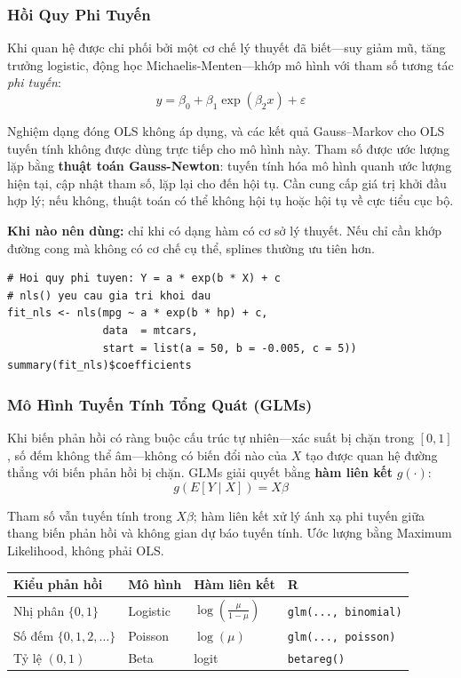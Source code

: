 \subsubsection{Hồi Quy Phi Tuyến}

Khi quan hệ được chi phối bởi một cơ chế lý thuyết đã biết---suy giảm mũ, tăng trưởng logistic, động học Michaelis-Menten---khớp mô hình với tham số tương tác \textit{phi tuyến}:
\[
  y = \beta_0 + \beta_1 \exp(\beta_2 x) + \varepsilon
\]

Nghiệm dạng đóng OLS không áp dụng, và các kết quả Gauss--Markov cho OLS tuyến tính không được dùng trực tiếp cho mô hình này. Tham số được ước lượng lặp bằng \textbf{thuật toán Gauss-Newton}: tuyến tính hóa mô hình quanh ước lượng hiện tại, cập nhật tham số, lặp lại cho đến hội tụ. Cần cung cấp giá trị khởi đầu hợp lý; nếu không, thuật toán có thể không hội tụ hoặc hội tụ về cực tiểu cục bộ.

\textbf{Khi nào nên dùng:} chỉ khi có dạng hàm có cơ sở lý thuyết. Nếu chỉ cần khớp đường cong mà không có cơ chế cụ thể, splines thường ưu tiên hơn.

\begin{lstlisting}[style=Rstyle]
# Hoi quy phi tuyen: Y = a * exp(b * X) + c
# nls() yeu cau gia tri khoi dau
fit_nls <- nls(mpg ~ a * exp(b * hp) + c,
               data  = mtcars,
               start = list(a = 50, b = -0.005, c = 5))
summary(fit_nls)$coefficients
\end{lstlisting}

\subsubsection{Mô Hình Tuyến Tính Tổng Quát (GLMs)}

Khi biến phản hồi có ràng buộc cấu trúc tự nhiên---xác suất bị chặn trong $[0,1]$, số đếm không thể âm---không có biến đổi nào của $X$ tạo được quan hệ đường thẳng với biến phản hồi bị chặn. GLMs giải quyết bằng \textbf{hàm liên kết} $g(\cdot)$:
\[
  g\!\left(E[Y \mid X]\right) = X\beta
\]

Tham số vẫn tuyến tính trong $X\beta$; hàm liên kết xử lý ánh xạ phi tuyến giữa thang biến phản hồi và không gian dự báo tuyến tính. Ước lượng bằng Maximum Likelihood, không phải OLS.

\begin{center}
\begin{tabular}{@{}llll@{}}
\toprule
\textbf{Kiểu phản hồi} & \textbf{Mô hình} & \textbf{Hàm liên kết} & \textbf{R} \\
\midrule
Nhị phân $\{0, 1\}$         & Logistic  & $\log\!\left(\frac{\mu}{1-\mu}\right)$ & \texttt{glm(..., binomial)} \\
Số đếm $\{0, 1, 2, \ldots\}$ & Poisson   & $\log(\mu)$ & \texttt{glm(..., poisson)} \\
Tỷ lệ $(0, 1)$              & Beta      & logit & \texttt{betareg()} \\
\bottomrule
\end{tabular}
\end{center}

